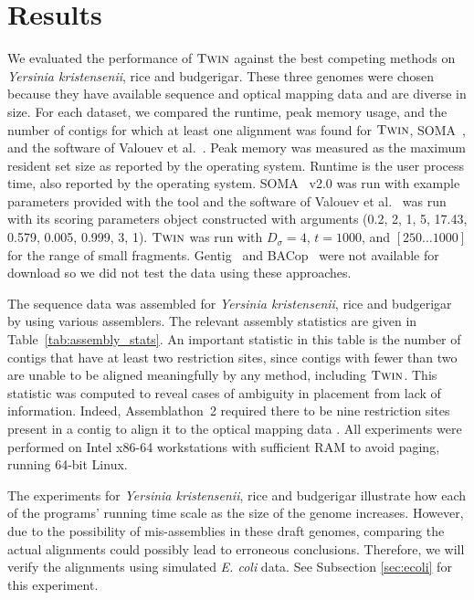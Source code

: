 \section{Results}\label{sec-results}

We evaluated the performance of $\mbox{\rm {\sc Twin}}$ against the best competing methods on \emph{Yersinia kristensenii}, rice and budgerigar.  These three genomes were chosen because they have available sequence and optical mapping data and are diverse in size.   For each dataset, we compared the runtime, peak memory usage, and the number of contigs for which at least one alignment was found for $\mbox{\rm {\sc Twin}}$, SOMA~\cite{Nagarajan08}, and the software of Valouev et al.~\cite{Valouev06}.  Peak memory was measured as the maximum resident set size as reported by the operating system.  Runtime is the user process time, also reported by the operating system.   SOMA~\cite{Nagarajan08} v2.0 was run with example parameters provided with the tool and the software of Valouev et al.~\cite{Valouev06} was run with its scoring parameters object constructed with arguments (0.2, 2, 1, 5, 17.43, 0.579, 0.005, 0.999, 3, 1). $\mbox{\rm {\sc Twin}} $ was run with $D_\sigma = 4$, $t = 1000$, and $[250 \ldots 1000]$ for the range of small fragments.
Gentig~\cite{Anantharaman01} and BACop~\cite{Zhou09} were not available for download so we did not test the data using these approaches.      
  
The sequence data was assembled for  \emph{Yersinia kristensenii}, rice and budgerigar by using various assemblers. 
The relevant assembly statistics are given in Table~\ref{tab:assembly_stats}.  An important statistic in this table is the number of contigs that have at least two restriction sites, since contigs with fewer than two are unable to be aligned meaningfully by any method, including $\mbox{\rm {\sc Twin}}$.  This statistic was computed to reveal cases of ambiguity in placement from lack of information. Indeed, Assemblathon~2 required there to be nine restriction sites present in a contig to align it to the optical mapping data \cite{bradnam2013assemblathon}.  All experiments were performed on Intel x86-64 workstations with sufficient RAM to avoid paging, running  64-bit Linux.

The experiments for \emph{Yersinia kristensenii}, rice and budgerigar illustrate how each of the programs' running time scale as the size of the genome increases.  However, due to the possibility of mis-assemblies in these draft genomes, comparing the actual alignments could possibly lead to erroneous conclusions.  Therefore, we will verify the alignments using simulated {\em E. coli} data.  See Subsection \ref{sec:ecoli} for this experiment.  

